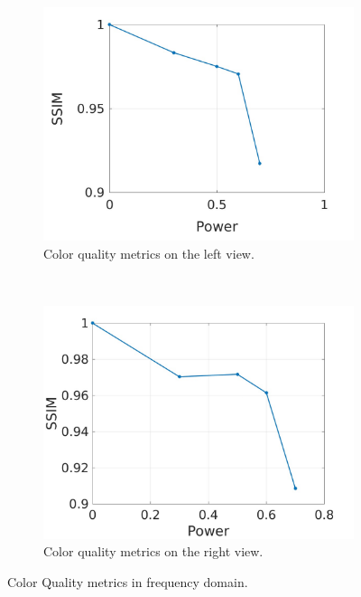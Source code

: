 \begin{figure}[h!]
    \centering
    \begin{subfigure}[t]{0.5\textwidth}
        \centering
\includegraphics[width=1\textwidth]{./img/qm/qm_left.jpg}
          \caption{\small{Color quality metrics on the left view.}}
\label{fig:qmcl}

    \end{subfigure}%
    ~ 
    \begin{subfigure}[t]{0.5\textwidth}
        \centering
\includegraphics[width=1\textwidth]{./img/qm/qm_disp_left.jpg}
           \caption{\small{Color quality metrics on the right view.}}
\label{fig:qmdl}
    \end{subfigure}
    \caption{Color Quality metrics in frequency domain.}
    \label{fig:qml}
\end{figure}

